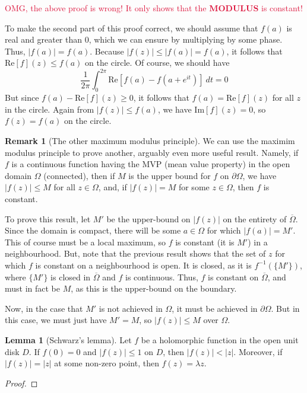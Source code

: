 \documentclass[aps,pra,showpacs,notitlepage,onecolumn,superscriptaddress,nofootinbib]{revtex4-1}
\newcommand{\pop}[1]{\textcolor{crimson}{#1}}
\theoremstyle{definition}
\newtheorem{lemma}{Lemma}[section]
\newtheorem{remark}{Remark}[section]
\begin{document}
\pop{OMG, the above proof is wrong! It only shows that the \textbf{MODULUS} is constant!}
\newline

\noindent To make the second part of this proof correct, we should assume that $f(a)$ is real and greater than $0$, which we can ensure by multiplying by some phase. Thus, $|f(a)| = f(a)$.
Because $|f(z)| \leq |f(a)| = f(a)$, it follows that $\text{Re}[f](z) \leq f(a)$ on the circle. Of course, we should have
\begin{equation}
  \frac{1}{2\pi} \displaystyle\int_{0}^{2\pi} \text{Re} \left[ f(a) - f(a + e^{it}) \right] \ dt = 0
\end{equation}
But since $f(a) - \text{Re}[f](z) \geq 0$, it follows that $f(a) = \text{Re}[f](z)$ for all $z$ in the circle. Again from $|f(z)| \leq f(a)$, we
have $\text{Im}[f](z) = 0$, so $f(z) = f(a)$ on the circle.
\newline

\begin{remark}[The other maximum modulus principle]
  We can use the maximim modulus principle to prove another, arguably even more useful result. Namely, if $f$ is a continuous function having the MVP (mean value property) in the open
  domain $\Omega$ (connected), then if $M$ is the upper bound for $f$ on $\partial \Omega$, we have $|f(z)| \leq M$ for all $z \in \Omega$, and, if $|f(z)| = M$
  for some $z \in \Omega$, then $f$ is constant.
  \newline

  \noindent To prove this result, let $M'$ be the upper-bound on $|f(z)|$ on the entirety of $\overline{\Omega}$. Since the domain is compact,
  there will be some $a \in \Omega$ for which $|f(a)| = M'$. This of course must be a local maximum, so $f$ is constant (it is $M'$) in a neighbourhood.
  But, note that the previous result shows that the set of $z$ for which $f$ is constant on a neighbourhood is open. It is closed, as it is $f^{-1}(\{M'\})$,
  where $\{M'\}$ is closed in $\overline{\Omega}$ and $f$ is continuous. Thus, $f$ is constant on $\overline{\Omega}$, and must in fact be $M$, as
  this is the upper-bound on the boundary.
  \newline

  \noindent Now, in the case that $M'$ is not achieved in $\Omega$, it must be achieved in $\partial \Omega$. But in this case, we must just have $M' = M$, so
  $|f(z)| \leq M$ over $\Omega$.
\end{remark}

\begin{lemma}[Schwarz's lemma]
  Let $f$ be a holomorphic function in the open unit disk $D$. If $f(0) = 0$ and $|f(z)| \leq 1$ on $D$, then $|f(z)| < |z|$. Moreover, if $|f(z)| = |z|$
  at some non-zero point, then $f(z) = \lambda z$.
\end{lemma}
\begin{proof}

  \end{proof}
\end{document}
